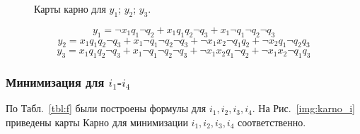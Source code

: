 \documentclass[a4paper, final]{article}
\begin{document}
\begin{figure}[H]
  \centering {}  
    \hspace{4ex}
    \caption{Карты карно для  $y_1$;  $y_2$;
     $y_3$.
    }
    \label{img:karno_y}
  \end{figure}

\[y_1 = \neg x_1 q_1 \neg q_2 + x_1 q_1 q_2 \neg q_3 + x_1 \neg q_1 \neg q_2 \neg q_3\]
\[y_2 = x_1 q_1 q_2 \neg q_3 + x_1 \neg q_1 \neg q_2 \neg q_3 + \neg x_1 x_2 \neg q_1 q_2 + \neg  x_2 q_1 \neg q_2 q_3\]
\[y_3 = x_1 q_1 q_2 \neg q_3 + x_1 \neg q_1 \neg q_2 \neg q_3 + \neg x_1 x_2 q_1 \neg q_2 + \neg x_1 x_2 \neg q_1 q_3\]

\subsubsection{Минимизация для $i_1$-$i_4$}
По Табл.~\ref{tbl:f} были построены формулы для $i_1, i_2, i_3, i_4$. На Рис.~\ref{img:karno_i} приведены карты Карно для минимизации $i_1, i_2, i_3, i_4$ соответственно.
\end{document}
